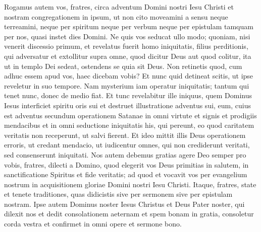 \begin{biblechapter}
\begin{biblechapter}
\verse Rogamus autem vos, fratres, circa adventum Domini nostri Iesu Christi et nostram congregationem in ipsum, 
\verse ut non cito moveamini a sensu neque terreamini, neque per spiritum neque per verbum neque per epistulam tamquam per nos, quasi instet dies Domini.
 \verse Ne quis vos seducat ullo modo; quoniam, nisi venerit discessio primum, et revelatus fuerit homo iniquitatis, filius perditionis, 
\verse qui adversatur et extollitur supra omne, quod dicitur Deus aut quod colitur, ita ut in templo Dei sedeat, ostendens se quia sit Deus.
 \verse Non retinetis quod, cum adhuc essem apud vos, haec dicebam vobis? 
\verse Et nunc quid detineat scitis, ut ipse reveletur in suo tempore. 
\verse Nam mysterium iam operatur iniquitatis; tantum qui tenet nunc, donec de medio fiat.
 \verse Et tunc revelabitur ille iniquus, quem Dominus Iesus interficiet spiritu oris sui et destruet illustratione adventus sui, 
\verse eum, cuius est adventus secundum operationem Satanae in omni virtute et signis et prodigiis mendacibus 
\verse et in omni seductione iniquitatis his, qui pereunt, eo quod caritatem veritatis non receperunt, ut salvi fierent. 
\verse Et ideo mittit illis Deus operationem erroris, ut credant mendacio, 
\verse ut iudicentur omnes, qui non crediderunt veritati, sed consenserunt iniquitati.
 \verse Nos autem debemus gratias agere Deo semper pro vobis, fratres, dilecti a Domino, quod elegerit vos Deus primitias in salutem, in sanctificatione Spiritus et fide veritatis; 
\verse ad quod et vocavit vos per evangelium nostrum in acquisitionem gloriae Domini nostri Iesu Christi.
 \verse Itaque, fratres, state et tenete traditiones, quas didicistis sive per sermonem sive per epistulam nostram. 
\verse Ipse autem Dominus noster Iesus Christus et Deus Pater noster, qui dilexit nos et dedit consolationem aeternam et spem bonam in gratia, 
\verse consoletur corda vestra et confirmet in omni opere et sermone bono.
 

\end{biblechapter}
\end{biblechapter}
